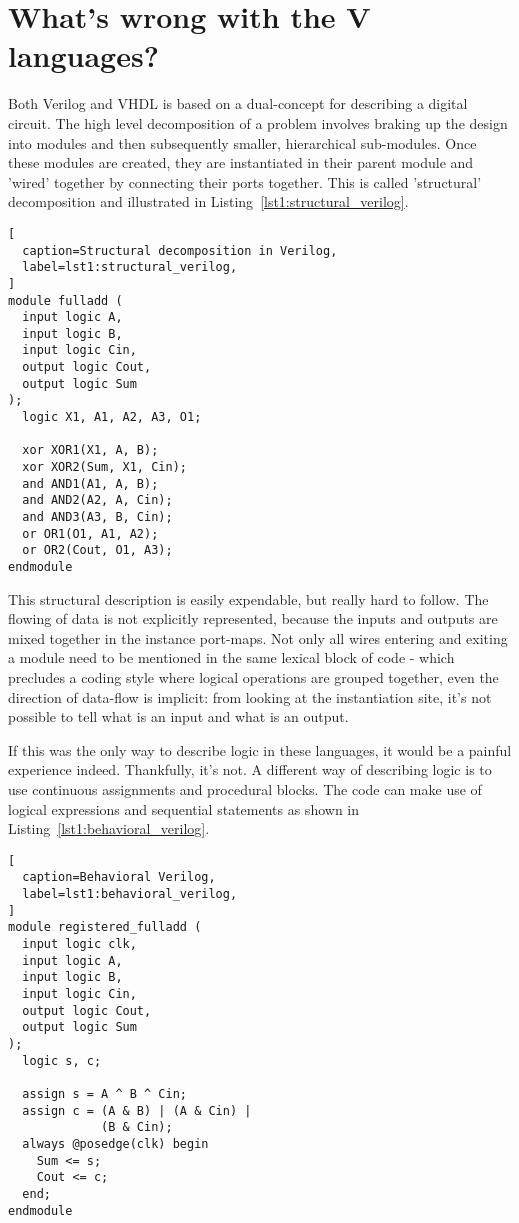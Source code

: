 \documentclass[conference,compsoc]{IEEEtran}
\begin{document}
\section{What's wrong with the V languages?}

Both Verilog and VHDL is based on a dual-concept for describing a digital circuit. The high
level decomposition of a problem involves braking up the design into modules and then
subsequently smaller, hierarchical sub-modules. Once these modules are created, they
are instantiated in their parent module and 'wired' together by connecting their ports
together. This is called 'structural' decomposition and illustrated in
Listing~\ref{lst1:structural_verilog}.

\begin{lstlisting}[
  caption=Structural decomposition in Verilog,
  label=lst1:structural_verilog,
]
module fulladd (
  input logic A,
  input logic B,
  input logic Cin,
  output logic Cout,
  output logic Sum
);
  logic X1, A1, A2, A3, O1;

  xor XOR1(X1, A, B);
  xor XOR2(Sum, X1, Cin);
  and AND1(A1, A, B);
  and AND2(A2, A, Cin);
  and AND3(A3, B, Cin);
  or OR1(O1, A1, A2);
  or OR2(Cout, O1, A3);
endmodule
\end{lstlisting}

This structural description is easily expendable, but really hard to follow. The
flowing of data is not explicitly represented, because the inputs and outputs are mixed
together in the instance port-maps. Not only all wires entering and exiting a module need
to be mentioned in the same lexical block of code - which precludes a coding style where
logical operations are grouped together, even the direction of data-flow is implicit:
from looking at the instantiation site, it's not possible to tell what is an input
and what is an output.

If this was the only way to describe logic in these languages, it would be a painful
experience indeed. Thankfully, it's not. A different way of describing logic is to use continuous
assignments and procedural blocks. The code can make use of logical expressions and sequential statements
as shown in Listing~\ref{lst1:behavioral_verilog}.

\begin{lstlisting}[
  caption=Behavioral Verilog,
  label=lst1:behavioral_verilog,
]
module registered_fulladd (
  input logic clk,
  input logic A,
  input logic B,
  input logic Cin,
  output logic Cout,
  output logic Sum
);
  logic s, c;

  assign s = A ^ B ^ Cin;
  assign c = (A & B) | (A & Cin) |
             (B & Cin);
  always @posedge(clk) begin
    Sum <= s;
    Cout <= c;
  end;
endmodule
\end{lstlisting}
\end{document}
